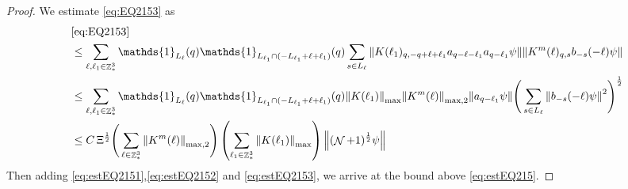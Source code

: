 \documentclass[sn-mathphys, Numbered ,a4paper]{sn-jnl}%
\DeclareMathOperator{\Z}{\mathbb{Z}}
\DeclareMathOperator{\NN}{\mathcal{N}}
\newcommand{\half}{\frac{1}{2}}
\theoremstyle{plain}
\theoremstyle{definition}
\theoremstyle{remark}
\theoremstyle{plain}
\theoremstyle{definition}
\theoremstyle{remark}
\begin{document}
\begin{proof}
We estimate \eqref{eq:EQ2153} as 
\begin{align}
	&\eqref{eq:EQ2153}\nonumber\\
	&\leq  \sum\limits_{\ell, \ell_1\in \Z^3_*} \mathds{1}_{L_{\ell}}(q) \mathds{1}_{L_{\ell_1}\cap (-L_{\ell_1}+\ell+\ell_1)}(q) \sum\limits_{ s \in L_{\ell}} \norm{K(\ell_1)_{q,-q+\ell+\ell_1} a_{q-\ell-\ell_1}  a_{q-\ell_1} \psi} \norm{ K^m(\ell)_{q,s}  b_{-s}(-\ell) \psi }\nonumber\\
	&\leq  \sum\limits_{\ell, \ell_1\in \Z^3_*} \mathds{1}_{L_{\ell}}(q) \mathds{1}_{L_{\ell_1}\cap (-L_{\ell_1}+\ell+\ell_1)}(q) \norm{K(\ell_1)}_{\mathrm{max}} \norm{K^m(\ell)}_{\mathrm{max,2}} \norm{  a_{q-\ell_1} \psi} \Bigg( \sum\limits_{ s \in L_{\ell}} \norm{ b_{-s}(-\ell) \psi }^2\Bigg)^\half\nonumber\\
	&\leq  C\, \Xi^\half \Bigg(\sum\limits_{\ell \in \Z^3_*}\norm{K^m(\ell)}_{\mathrm{max,2}}\Bigg) \left( \sum\limits_{\ell_1\in \Z^3_*} \norm{ K(\ell_1)}_{\mathrm{max}} \right) \norm{(\NN+1)^\half\psi}\label{eq:estEQ2153}
\end{align}
Then adding \eqref{eq:estEQ2151},\eqref{eq:estEQ2152} and \eqref{eq:estEQ2153}, we arrive at the bound above \eqref{eq:estEQ215}.
\end{proof}
\end{document}
